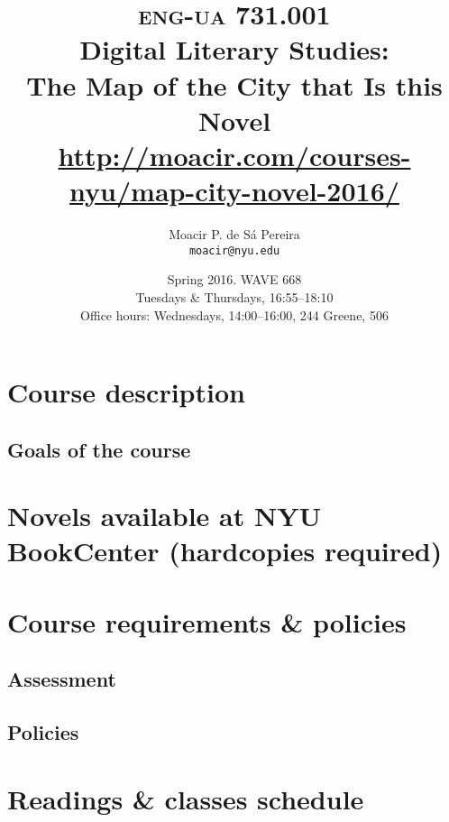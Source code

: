 \documentclass[10pt,article,oneside]{memoir}
\makeatletter
\def\myauthor{Author}
\def\mytitle{Title}
\def\myaddress{}
\def\myemail{}
\def\mycoursecode{}
\def\mycoursename{}
\def\mycoursetime{}
\def\mycourseurl{}
\def\myterm{}
\def\myofficehours{}
\def\mycoursecode{eng-ua 731.001}
\def\mycoursename{Digital Literary Studies:\\ The Map of the City that Is this Novel}
\def\myterm{Spring 2016}
\def\myaddress{WAVE 668}
\def\myemail{moacir@nyu.edu}
\def\myauthor{Moacir P. de Sá Pereira}
\def\mytitle{{\normalsize \textsc{\mycoursecode}\\} \HUGE \mycoursename}
\def\mycoursetime{Tuesdays \& Thursdays, 16:55--18:10}
\def\mycourseurl{http://moacir.com/courses-nyu/map-city-novel-2016/}
\def\myofficehours{Wednesdays, 14:00--16:00, 244 Greene, 506}
\makeatother
\begin{document}
 \setsansfont[Mapping=tex-text]{Helvetica} 
 \setmonofont[Mapping=tex-text,Scale=0.8]{DejaVu Sans Mono}

\title{\LARGE \mytitle \\ \Large\url{\mycourseurl}}     
\author{\Large\myauthor\\ \small\texttt{\noindent\myemail}}
\date{\myterm. \myaddress \\ \mycoursetime \\ \small Office hours: \myofficehours}

\maketitle


\section*{Course description}


\subsection*{Goals of the course}

     
\section*{Novels available at NYU BookCenter \small (hardcopies required)}

	
\section*{Course requirements \& policies}

  \subsection*{Assessment}
  

	\subsection*{Policies}
	

\newpage

\section*{Readings \& classes schedule}


\newpage


\newpage
\printbibliography 
\end{document}
